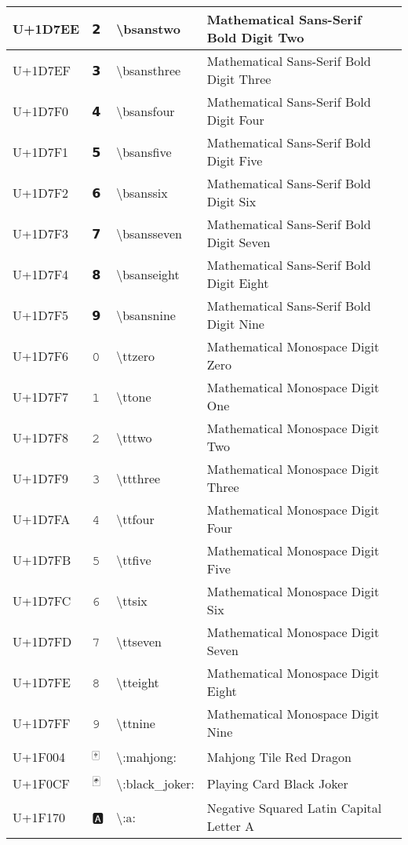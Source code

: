 \begin{table}[h]
\begin{tabulary}{\linewidth}{|L|L|L|L|}
\hline
U+1D7EE & 𝟮 & {\textbackslash}bsanstwo & Mathematical Sans-Serif Bold Digit Two \\
\hline
U+1D7EF & 𝟯 & {\textbackslash}bsansthree & Mathematical Sans-Serif Bold Digit Three \\
\hline
U+1D7F0 & 𝟰 & {\textbackslash}bsansfour & Mathematical Sans-Serif Bold Digit Four \\
\hline
U+1D7F1 & 𝟱 & {\textbackslash}bsansfive & Mathematical Sans-Serif Bold Digit Five \\
\hline
U+1D7F2 & 𝟲 & {\textbackslash}bsanssix & Mathematical Sans-Serif Bold Digit Six \\
\hline
U+1D7F3 & 𝟳 & {\textbackslash}bsansseven & Mathematical Sans-Serif Bold Digit Seven \\
\hline
U+1D7F4 & 𝟴 & {\textbackslash}bsanseight & Mathematical Sans-Serif Bold Digit Eight \\
\hline
U+1D7F5 & 𝟵 & {\textbackslash}bsansnine & Mathematical Sans-Serif Bold Digit Nine \\
\hline
U+1D7F6 & 𝟶 & {\textbackslash}ttzero & Mathematical Monospace Digit Zero \\
\hline
U+1D7F7 & 𝟷 & {\textbackslash}ttone & Mathematical Monospace Digit One \\
\hline
U+1D7F8 & 𝟸 & {\textbackslash}tttwo & Mathematical Monospace Digit Two \\
\hline
U+1D7F9 & 𝟹 & {\textbackslash}ttthree & Mathematical Monospace Digit Three \\
\hline
U+1D7FA & 𝟺 & {\textbackslash}ttfour & Mathematical Monospace Digit Four \\
\hline
U+1D7FB & 𝟻 & {\textbackslash}ttfive & Mathematical Monospace Digit Five \\
\hline
U+1D7FC & 𝟼 & {\textbackslash}ttsix & Mathematical Monospace Digit Six \\
\hline
U+1D7FD & 𝟽 & {\textbackslash}ttseven & Mathematical Monospace Digit Seven \\
\hline
U+1D7FE & 𝟾 & {\textbackslash}tteight & Mathematical Monospace Digit Eight \\
\hline
U+1D7FF & 𝟿 & {\textbackslash}ttnine & Mathematical Monospace Digit Nine \\
\hline
U+1F004 & 🀄 & {\textbackslash}:mahjong: & Mahjong Tile Red Dragon \\
\hline
U+1F0CF & 🃏 & {\textbackslash}:black\_joker: & Playing Card Black Joker \\
\hline
U+1F170 & 🅰 & {\textbackslash}:a: & Negative Squared Latin Capital Letter A \\

\end{tabulary}
\end{table}
